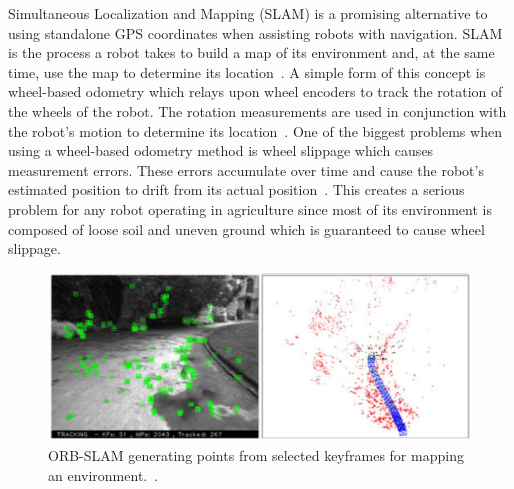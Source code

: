 \documentclass[12pt]{article}
\begin{document}
Simultaneous Localization and Mapping (SLAM) is a promising alternative to using standalone GPS coordinates when assisting robots with navigation. SLAM is the process a robot takes to build a map of its environment and, at the same time, use the map to determine its location~\cite{durrant2006simultaneous, comelli2019evaluation}. A simple form of this concept is wheel-based odometry which relays upon wheel encoders to track the rotation of the wheels of the robot. The rotation measurements are used in conjunction with the robot's motion to determine its location~\cite{yousif2015overview}. One of the biggest problems when using a wheel-based odometry method is wheel slippage which causes measurement errors. These errors accumulate over time and cause the robot's estimated position to drift from its actual position~\cite{yousif2015overview}. This creates a serious problem for any robot operating in agriculture since most of its environment is composed of loose soil and uneven ground which is guaranteed to cause wheel slippage.

\begin{figure}[h]
\centering
\includegraphics[width=1.0\textwidth]{mapPoints.png}
\caption{ORB-SLAM generating points from selected keyframes for mapping an environment.~\cite{mur2015orb}.}
\label{fig:points}
\end{figure}
\end{document}
